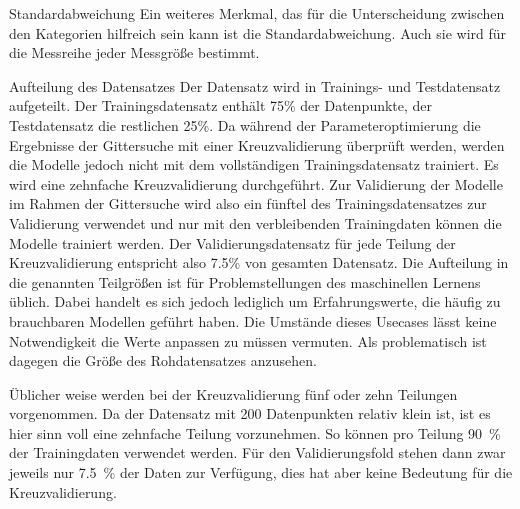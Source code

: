 Standardabweichung
Ein weiteres Merkmal, das für die Unterscheidung zwischen den Kategorien hilfreich sein kann ist die Standardabweichung. Auch sie wird für die Messreihe jeder Messgröße bestimmt. 

Aufteilung des Datensatzes
Der Datensatz wird in Trainings- und Testdatensatz aufgeteilt. Der Trainingsdatensatz enthält 75\% der Datenpunkte, der Testdatensatz die restlichen 25\%. Da während der Parameteroptimierung die Ergebnisse der Gittersuche mit einer Kreuzvalidierung überprüft werden, werden die Modelle jedoch nicht mit dem vollständigen Trainingsdatensatz trainiert. Es wird eine zehnfache Kreuzvalidierung durchgeführt. Zur Validierung der Modelle im Rahmen der Gittersuche wird also ein fünftel des Trainingsdatensatzes zur Validierung verwendet und nur mit den verbleibenden Trainingdaten können die Modelle trainiert werden. Der Validierungsdatensatz für jede Teilung der Kreuzvalidierung entspricht also \num{7,5}\% von gesamten Datensatz. Die Aufteilung in die genannten Teilgrößen ist für Problemstellungen des maschinellen Lernens üblich. Dabei handelt es sich jedoch lediglich um Erfahrungswerte, die häufig zu brauchbaren Modellen geführt haben. Die Umstände dieses Usecases lässt keine Notwendigkeit die Werte anpassen zu müssen vermuten. Als problematisch ist dagegen die Größe des Rohdatensatzes anzusehen.

Üblicher weise werden bei der Kreuzvalidierung fünf oder zehn Teilungen vorgenommen. Da der Datensatz mit 200 Datenpunkten relativ klein ist, ist es hier sinn voll eine zehnfache Teilung vorzunehmen. So können pro Teilung \SI{90}{\percent} der Trainingdaten verwendet werden. Für den Validierungsfold stehen dann zwar jeweils nur \SI{7,5}{\percent} der Daten zur Verfügung, dies hat aber keine Bedeutung für die Kreuzvalidierung.